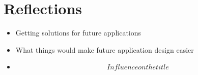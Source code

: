 \chapter{Reflections}
\label{cha:reflections}

\begin{itemize}
  \item Getting solutions for future applications
  \item What things would make future application design easier
  \item \[Influence on the title\]
\end{itemize}
